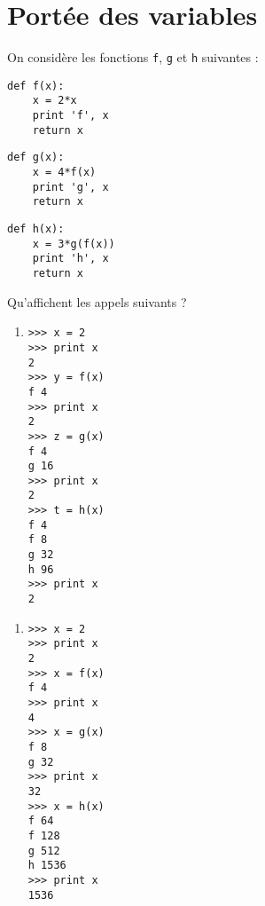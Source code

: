 \documentclass[12pt]{article}
\newenvironment{py}[1]{\begin{minipage}[t]{#1}\footnotesize}{\end{minipage}}
\begin{document}
\section{Portée des variables}
On considère les fonctions {\tt f}, {\tt g} et {\tt h} suivantes :
\begin{center}
\begin{py}{4cm}
\begin{verbatim}
def f(x):
    x = 2*x
    print 'f', x
    return x
\end{verbatim}
\end{py}\hspace*{1cm}
\begin{py}{4cm}
\begin{verbatim}
def g(x):
    x = 4*f(x)
    print 'g', x
    return x
\end{verbatim}
\end{py}\hspace*{1cm}
\begin{py}{4cm}
\begin{verbatim}
def h(x):
    x = 3*g(f(x))
    print 'h', x
    return x
\end{verbatim}
\end{py}
\end{center}

Qu'affichent les appels suivants ?
\vspace*{2mm}

\begin{minipage}{7cm}
\begin{enumerate}
\item 

\begin{py}{3cm}
\begin{verbatim}
>>> x = 2
>>> print x
2
>>> y = f(x)
f 4
>>> print x
2
>>> z = g(x)
f 4
g 16
>>> print x
2
>>> t = h(x)
f 4
f 8
g 32
h 96
>>> print x
2
\end{verbatim}
\end{py}
\end{enumerate}
\end{minipage}
\hfill
\begin{minipage}{7cm}
\begin{enumerate}

\item

\begin{py}{4cm}
\begin{verbatim}
>>> x = 2
>>> print x
2
>>> x = f(x)
f 4
>>> print x
4
>>> x = g(x)
f 8
g 32
>>> print x
32
>>> x = h(x)
f 64
f 128
g 512
h 1536
>>> print x
1536
\end{verbatim}
\end{py}

\end{enumerate}
\end{minipage}
\end{document}
